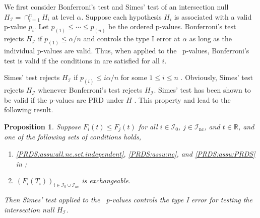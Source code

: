 \documentclass[a4paper,11pt]{article}
\theoremstyle{plain}
\newtheorem{proposition}{Proposition}[section]
\theoremstyle{definition}
\def\RR{\mathbb{R}}
\def\calI{\mathcal{I}}
\theoremstyle{plain}
\newcommand{\No}{{n}}
\newcommand{\pval}[1]{{p_{#1}}}
\newcommand{\pvalOrder}[1]{{p_{(#1)}}}
\newcommand{\testStatistics}[1]{{T_{#1}}}
\newcommand{\cdfTestStatistics}[1]{{F_{#1}}}
\newcommand{\nickname}{{\text{RANC}}}
\newcommand{\hypothesis}[1]{{H_{#1}}}
\newcommand{\hypothesisIndex}[1]{{\calI_{#1}}}
\begin{document}
We first consider Bonferroni's test and Simes' test of an intersection
null $\hypothesis{\calI} = \cap_{i=1}^n \hypothesis{i}$ at level
$\alpha$. Suppose each hypothesis $\hypothesis{i}$ is associated with
a valid p-value $\pval{i}$. Let $\pval{(1)} \leq \dotsb \leq
\pval{(n)}$ be the ordered p-values. Bonferroni's test rejects
$\hypothesis{\calI}$ if $\pval{(1)} \leq \alpha / n$ and controls the type I
error at $\alpha$ as long as the individual p-values are valid. Thus,
when applied to the \nickname~p-values, Bonferroni's test is valid if the
conditions in  are satisfied for
all $i$.

Simes' test rejects
$\hypothesis{\calI}$ if $\pvalOrder{i} \le i  \alpha/\No$ for some $1 \le i \le n$
\cite{simes1986improved}. Obviously, Simes' test rejects
$\hypothesis{\calI}$ whenever Bonferroni's test rejects
$\hypothesis{\calI}$. Simes' test has been shown to be valid if the
p-values are PRD under $H$ \cite{sarkar1997simes}. This property and
 lead to the following result.

\begin{proposition}\label{prop:simes}
Suppose $\cdfTestStatistics{i}(t) \le \cdfTestStatistics{j}(t)$ for
all $i \in \hypothesisIndex{0}$, $j \in \hypothesisIndex{\text{nc}}$,
and $t \in \RR$,
and one of the following sets of conditions holds,
\begin{enumerate}[label = \roman*.,ref = (\roman*)]
    \item \label{simes:assu:PRDS}
      \ref{PRDS:assu:all.nc.set.independent},
      \ref{PRDS:assu:nc}, and \ref{PRDS:assu:PRDS} in
      ;
    \item \label{simes:assu:exchangeable} $\left( \cdfTestStatistics{i}(\testStatistics{i})
      \right)_{i \in \hypothesisIndex{0} \cup
        \hypothesisIndex{\text{nc}}}$ is exchangeable.
\end{enumerate}
Then Simes' test applied to the \nickname~p-values controls the type I error
for testing the intersection null $\hypothesis{\calI}$.
\end{proposition}
\end{document}
